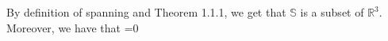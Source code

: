 \documentclass[10pt,letter]{article}
\begin{document}
By definition of spanning and Theorem 1.1.1, we get that $\mathbb{S}$ is a subset of $\mathbb{R}^3$. Moreover, we have that $$=0\
\end{document}
